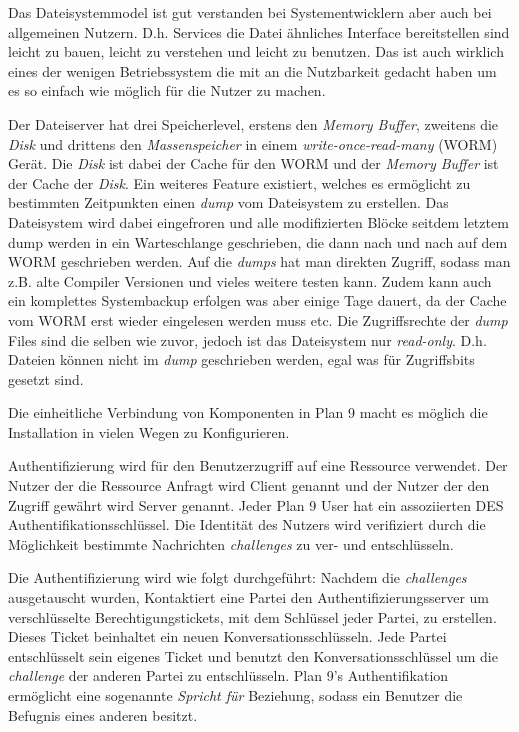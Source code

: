 \documentclass[11pt,technote]{IEEEtran}
\begin{document}
        Das Dateisystemmodel ist gut verstanden bei Systementwicklern aber auch bei allgemeinen Nutzern. 
        D.h. Services die Datei \"ahnliches Interface bereitstellen sind leicht zu bauen, leicht zu verstehen
        und leicht zu benutzen. Das ist auch wirklich eines der wenigen Betriebssystem die mit an die Nutzbarkeit
        gedacht haben um es so einfach wie m\"oglich f\"ur die Nutzer zu machen.
        
        Der Dateiserver hat drei Speicherlevel, erstens den \textit{Memory Buffer}, zweitens die \textit{Disk} und drittens den \textit{Massenspeicher}
        in einem \textit{write-once-read-many} (WORM) Ger\"at. 
        Die \textit{Disk} ist dabei der Cache f\"ur den WORM und der \textit{Memory Buffer} ist der Cache der \textit{Disk}.
        Ein weiteres Feature existiert, welches es erm\"oglicht zu bestimmten Zeitpunkten einen \textit{dump} vom
        Dateisystem zu erstellen. Das Dateisystem wird dabei eingefroren und alle modifizierten Bl\"ocke seitdem letztem dump werden in ein Warteschlange geschrieben,
        die dann nach und nach auf dem WORM geschrieben werden. Auf die \textit{dumps} hat man direkten Zugriff, sodass man z.B. alte Compiler Versionen
        und vieles weitere testen kann.
        Zudem kann auch ein komplettes Systembackup erfolgen was aber einige Tage dauert, da der Cache vom WORM erst wieder eingelesen werden muss etc.
        Die Zugriffsrechte der \textit{dump} Files sind die selben wie zuvor, jedoch ist das Dateisystem nur \textit{read-only}.
        D.h. Dateien k\"onnen nicht im \textit{dump} geschrieben werden, egal was f\"ur Zugriffsbits gesetzt sind.
        
        Die einheitliche Verbindung von Komponenten in Plan 9 macht es m\"oglich die Installation in vielen Wegen zu Konfigurieren.
        
        Authentifizierung wird f\"ur den Benutzerzugriff auf eine Ressource verwendet. Der Nutzer der die Ressource Anfragt wird Client genannt und der
        Nutzer der den Zugriff gew\"ahrt wird Server genannt. Jeder Plan 9 User hat ein assoziierten DES Authentifikationsschl\"ussel. Die Identit\"at
        des Nutzers wird verifiziert durch die M\"oglichkeit bestimmte Nachrichten \textit{challenges} zu ver- und entschl\"usseln.
        
        Die Authentifizierung wird wie folgt durchgef\"uhrt: Nachdem die \textit{challenges} ausgetauscht wurden, 
        Kontaktiert eine Partei den Authentifizierungsserver um verschl\"usselte Berechtigungstickets, 
        mit dem Schl\"ussel jeder Partei, zu erstellen. Dieses Ticket beinhaltet ein neuen Konversationsschl\"usseln.
        Jede Partei entschl\"usselt sein eigenes Ticket und benutzt den Konversationsschl\"ussel um die \textit{challenge} der anderen Partei zu entschl\"usseln.     
        Plan 9's Authentifikation erm\"oglicht eine sogenannte \textit{Spricht f\"ur} Beziehung, sodass ein Benutzer die Befugnis eines anderen besitzt.
        
\end{document}

